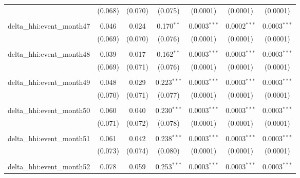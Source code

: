 \begin{table}[H]
{\begin{tabular}{@{\extracolsep{5pt}}lcccccc}
   & (0.068) & (0.070) & (0.075) & (0.0001) & (0.0001) & (0.0001) \\  

   & & & & & & \\  

  delta\_hhi:event\_month47 & 0.046 & 0.024 & 0.170$^{**}$ & 0.0003$^{***}$ & 0.0002$^{***}$ & 0.0003$^{***}$ \\  

   & (0.069) & (0.070) & (0.076) & (0.0001) & (0.0001) & (0.0001) \\  

   & & & & & & \\  

  delta\_hhi:event\_month48 & 0.039 & 0.017 & 0.162$^{**}$ & 0.0003$^{***}$ & 0.0003$^{***}$ & 0.0003$^{***}$ \\  

   & (0.069) & (0.071) & (0.076) & (0.0001) & (0.0001) & (0.0001) \\  

   & & & & & & \\  

  delta\_hhi:event\_month49 & 0.048 & 0.029 & 0.223$^{***}$ & 0.0003$^{***}$ & 0.0003$^{***}$ & 0.0003$^{***}$ \\  

   & (0.070) & (0.071) & (0.077) & (0.0001) & (0.0001) & (0.0001) \\  

   & & & & & & \\  

  delta\_hhi:event\_month50 & 0.060 & 0.040 & 0.230$^{***}$ & 0.0003$^{***}$ & 0.0003$^{***}$ & 0.0003$^{***}$ \\  

   & (0.071) & (0.072) & (0.078) & (0.0001) & (0.0001) & (0.0001) \\  

   & & & & & & \\  

  delta\_hhi:event\_month51 & 0.061 & 0.042 & 0.238$^{***}$ & 0.0003$^{***}$ & 0.0003$^{***}$ & 0.0003$^{***}$ \\  

   & (0.073) & (0.074) & (0.080) & (0.0001) & (0.0001) & (0.0001) \\  

   & & & & & & \\  

  delta\_hhi:event\_month52 & 0.078 & 0.059 & 0.253$^{***}$ & 0.0003$^{***}$ & 0.0003$^{***}$ & 0.0003$^{***}$ \\  


\end{tabular}}
\end{table}
